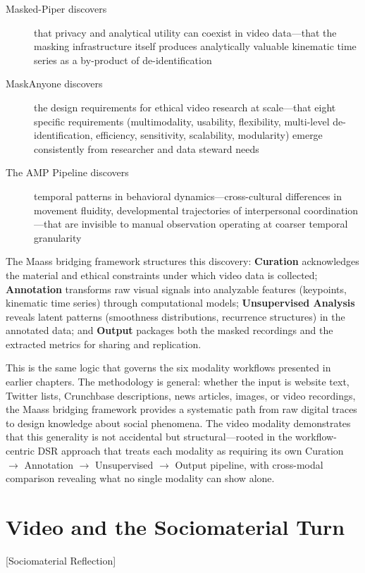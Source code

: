 \documentclass[../main.tex]{subfiles}
\begin{document}
\begin{description}
    \item[Masked-Piper discovers] that privacy and analytical utility can coexist in video data---that the masking infrastructure itself produces analytically valuable kinematic time series as a by-product of de-identification
    \item[MaskAnyone discovers] the design requirements for ethical video research at scale---that eight specific requirements (multimodality, usability, flexibility, multi-level de-identification, efficiency, sensitivity, scalability, modularity) emerge consistently from researcher and data steward needs
    \item[The AMP Pipeline discovers] temporal patterns in behavioral dynamics---cross-cultural differences in movement fluidity, developmental trajectories of interpersonal coordination---that are invisible to manual observation operating at coarser temporal granularity
\end{description}

The Maass bridging framework structures this discovery: \textbf{Curation} acknowledges the material and ethical constraints under which video data is collected; \textbf{Annotation} transforms raw visual signals into analyzable features (keypoints, kinematic time series) through computational models; \textbf{Unsupervised Analysis} reveals latent patterns (smoothness distributions, recurrence structures) in the annotated data; and \textbf{Output} packages both the masked recordings and the extracted metrics for sharing and replication.

This is the same logic that governs the six modality workflows presented in earlier chapters. The methodology is general: whether the input is website text, Twitter lists, Crunchbase descriptions, news articles, images, or video recordings, the Maass bridging framework provides a systematic path from raw digital traces to design knowledge about social phenomena. The video modality demonstrates that this generality is not accidental but structural---rooted in the workflow-centric DSR approach that treats each modality as requiring its own Curation $\rightarrow$ Annotation $\rightarrow$ Unsupervised $\rightarrow$ Output pipeline, with cross-modal comparison revealing what no single modality can show alone.


\section{Video and the Sociomaterial Turn}[Sociomaterial Reflection]
\end{document}
